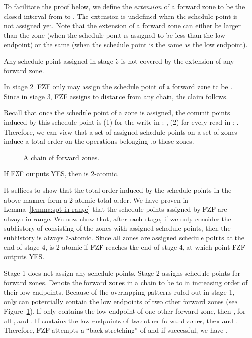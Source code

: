 {To facilitate the proof below, we define the \emph{extension} of a
forward zone  to be the closed interval from  to
.  The extension is undefined when the schedule point is not
assigned yet.  Note that the extension of a forward zone can either be
larger than the zone (when the schedule point is assigned to be less
than the low endpoint) or the same (when the schedule point is the
same as the low endpoint).

\begin{lemma}
  \label{lemma:bz-spt-uncovered}
  Any schedule point  assigned in stage 3 is not covered by the
  extension of any forward zone.
\end{lemma}

\proof In stage 2, FZF only may assign the schedule point of a forward
zone  to be .  Since in stage 3, FZF assigns
 to distance  from any chain, the claim
follows.  \QED

Recall that once the schedule point of a zone  is assigned, the
commit points induced by this schedule point is (1) for the write 
in : , (2) for every read  in : .  Therefore, we can view that a set of assigned
schedule points on a set of zones induce a total order on the
operations belonging to those zones.

\begin{figure}[tbp]
  \caption{A chain of forward zones.}
  \label{fig:chain}
\end{figure}

\begin{lemma}
  \label{lemma:fzf-yes-implies-h-2-atomic}
  If FZF outputs YES, then  is 2-atomic.
\end{lemma}

\proof It suffices to show that the total order induced by the
schedule points in the above manner form a 2-atomic total order.  We
have proven in Lemma~\ref{lemma:spt-in-range} that the schedule points
assigned by FZF are always in range.  We now show that, after each
stage, if we only consider the subhistory of  consisting of the
zones with assigned schedule points, then the subhistory is always
2-atomic.  Since all zones are assigned schedule points at the end of
stage 4,  is 2-atomic if FZF reaches the end of stage 4, at which
point FZF outputs YES.

Stage 1 does not assign any schedule points.  Stage 2 assigns schedule
points for forward zones.  Denote the forward zones in a chain to be
 to  in increasing order of their low endpoints.
Because of the overlapping patterns ruled out in stage 1, only 
can potentially contain the low endpoints of two other forward zones
(see Figure~\ref{fig:chain}).  If  only contains the low endpoint
of one other forward zone, then , for all , and .  If  contains the low endpoints
of two other forward zones, then  and
.  Therefore, FZF attempts a ``back stretching'' of
 and if successful, we have .

}

